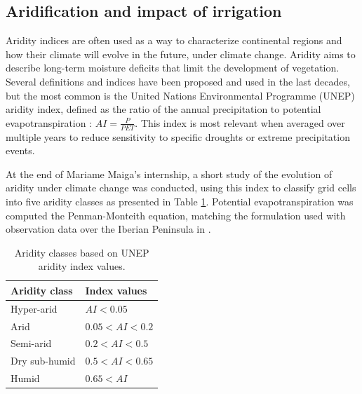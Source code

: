 \clearpage

\subsection{Aridification and impact of irrigation}

Aridity indices are often used as a way to characterize continental regions and how their climate will evolve in the future, under climate change. Aridity aims to describe long-term moisture deficits that limit the development of vegetation. Several definitions and indices have been proposed and used in the last decades, but the most common is the United Nations Environmental Programme (UNEP) aridity index, defined as the ratio of the annual precipitation to potential evapotranspiration : $AI = \frac{P}{PET}$. %
This index is most relevant when averaged over multiple years to reduce sensitivity to specific droughts or extreme precipitation events.

At the end of Mariame Maiga's internship, a short study of the evolution of aridity under climate change was conducted, using this index to classify grid cells into five aridity classes as presented in Table \ref{table:aridity_classes}. 
Potential evapotranspiration was computed the Penman-Monteith equation, matching the formulation used with observation data over the Iberian Peninsula in \citet{begueria_aridity_2025}.

\begin{table}[h]
    \centering
    \begin{tabular}{|l|l|}
        \hline
        \textbf{Aridity class} & \textbf{Index values} \\
        \hline
        Hyper-arid & \( AI < 0.05 \) \\
        \hline
        Arid & \( 0.05 < AI < 0.2 \) \\
        \hline
        Semi-arid & \( 0.2 < AI < 0.5 \) \\
        \hline
        Dry sub-humid & \( 0.5 < AI < 0.65 \) \\
        \hline
        Humid & \( 0.65 < AI \) \\
        \hline
    \end{tabular}
    \caption{Aridity classes based on UNEP aridity index values.}
    \label{table:aridity_classes}
\end{table}

